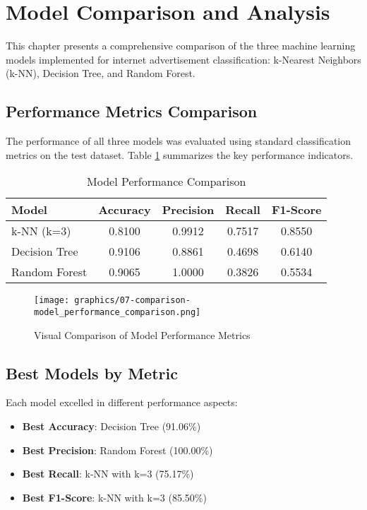 \section{Model Comparison and Analysis}

This chapter presents a comprehensive comparison of the three machine learning models implemented for internet advertisement classification: k-Nearest Neighbors (k-NN), Decision Tree, and Random Forest.

\subsection{Performance Metrics Comparison}

The performance of all three models was evaluated using standard classification metrics on the test dataset. Table \ref{tab:model_comparison} summarizes the key performance indicators.

\begin{table}[h]
\centering
\caption{Model Performance Comparison}
\label{tab:model_comparison}
\begin{tabular}{|l|c|c|c|c|}
\hline
\textbf{Model} & \textbf{Accuracy} & \textbf{Precision} & \textbf{Recall} & \textbf{F1-Score} \\
\hline
k-NN (k=3) & 0.8100 & 0.9912 & 0.7517 & 0.8550 \\
Decision Tree & 0.9106 & 0.8861 & 0.4698 & 0.6140 \\
Random Forest & 0.9065 & 1.0000 & 0.3826 & 0.5534 \\
\hline
\end{tabular}
\end{table}

\begin{figure}[h]
\centering
\texttt{[image: graphics/07-comparison-model\_performance\_comparison.png]}
\caption{Visual Comparison of Model Performance Metrics}
\label{fig:performance_comparison}
\end{figure}

\subsection{Best Models by Metric}

Each model excelled in different performance aspects:

\begin{itemize}
    \item \textbf{Best Accuracy}: Decision Tree (91.06\%)
    \item \textbf{Best Precision}: Random Forest (100.00\%)
    \item \textbf{Best Recall}: k-NN with k=3 (75.17\%)
    \item \textbf{Best F1-Score}: k-NN with k=3 (85.50\%)
\end{itemize}

